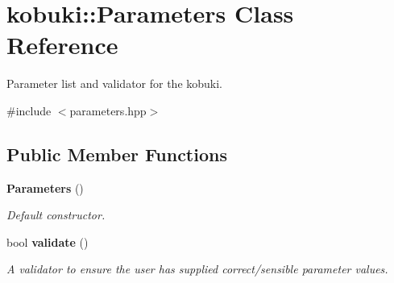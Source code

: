 \section{kobuki\-:\-:\-Parameters \-Class \-Reference}
\label{classkobuki_1_1Parameters}


\-Parameter list and validator for the kobuki.  




{\ttfamily \#include $<$parameters.\-hpp$>$}

\subsection*{\-Public \-Member \-Functions}
\begin{DoxyCompactItemize}
\item 
{\bf \-Parameters} ()
\begin{DoxyCompactList}\small\item\em \-Default constructor. \end{DoxyCompactList}\item 
bool {\bf validate} ()
\begin{DoxyCompactList}\small\item\em \-A validator to ensure the user has supplied correct/sensible parameter values. \end{DoxyCompactList}\end{DoxyCompactItemize}
